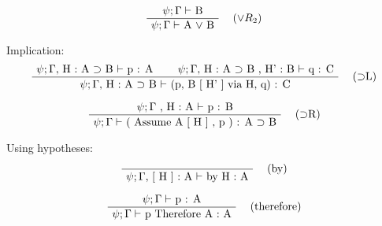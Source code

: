 \documentclass[twoside,a4paper]{article}
\begin{document}
\[
\AxiomC{$\psi ; \Gamma \vdash$ B}
\RightLabel{\quad ($\vee R_2$)}
\UnaryInfC{$\psi ; \Gamma \vdash$ A $\vee$ B}
\DisplayProof
\]

Implication:
\[
\AxiomC{$\psi ; \Gamma ,$ H : A $\supset$ B $\vdash$ p : A}
\AxiomC{$\psi ; \Gamma ,$ H : A $\supset$ B , H' : B $\vdash$ q : C}
\RightLabel{\quad ($\supset$L)}
\BinaryInfC{$\psi ; \Gamma ,$ H : A $\supset$ B $\vdash$
(p, B [ H' ] via H, q) : C}
\DisplayProof
\]

\[
\AxiomC{$\psi ; \Gamma$ , H : A $\vdash$ p : B}
\RightLabel{\quad ($\supset$R)}
\UnaryInfC{$\psi ; \Gamma \vdash$ ( Assume A [ H ] , p ) : A 
$\supset$ B}
\DisplayProof
\]

Using hypotheses:

\[
\AxiomC{}
\RightLabel{\quad (by)}
\UnaryInfC{$\psi ; \Gamma , $ [ H ] : A $\vdash$ by H : A}
\DisplayProof
\]

\[
\AxiomC{$\psi ; \Gamma \vdash$ p : A}
\RightLabel{\quad (therefore)}
\UnaryInfC{$\psi ; \Gamma \vdash$ p Therefore A : A}
\DisplayProof
\]
\end{document}
